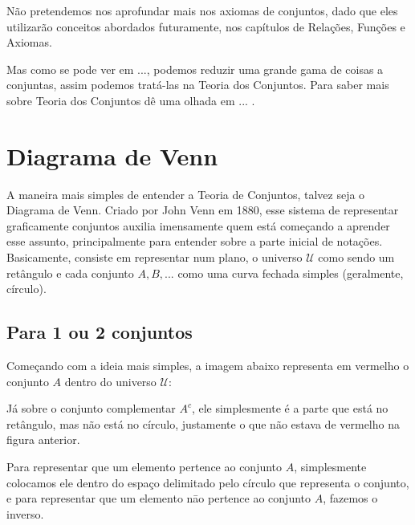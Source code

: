   Não pretendemos nos aprofundar mais nos axiomas de conjuntos, dado que eles utilizarão conceitos abordados futuramente, nos capítulos de Relações, Funções e Axiomas.
  
  Mas como se pode ver em ..., podemos reduzir uma grande gama de coisas a conjuntas, assim podemos tratá-las na Teoria dos Conjuntos. Para saber mais sobre Teoria dos Conjuntos dê uma olhada em ... .

\section{Diagrama de Venn}
A maneira mais simples de entender a Teoria de Conjuntos, talvez seja o Diagrama de Venn. Criado por John Venn em 1880, esse sistema de representar graficamente conjuntos auxilia imensamente quem está começando a aprender esse assunto, principalmente para entender sobre a parte inicial de notações. Basicamente, consiste em representar num plano, o universo $\mathcal U$ como sendo um retângulo e cada conjunto $A,B,...$ como uma curva fechada simples (geralmente, círculo).
    
  \subsection{Para 1 ou 2 conjuntos}
  Começando com a ideia mais simples, a imagem abaixo representa em vermelho o conjunto $A$ dentro do universo $\mathcal U$:
  
  
  Já sobre o conjunto complementar $A^c$, ele simplesmente é a parte que está no retângulo, mas não está no círculo, justamente o que não estava de vermelho na figura anterior.
  
  
  Para representar que um elemento pertence ao conjunto $A$, simplesmente colocamos ele dentro do espaço delimitado pelo círculo que representa o conjunto, e para representar que um elemento nāo pertence ao conjunto $A$, fazemos o inverso.
  
